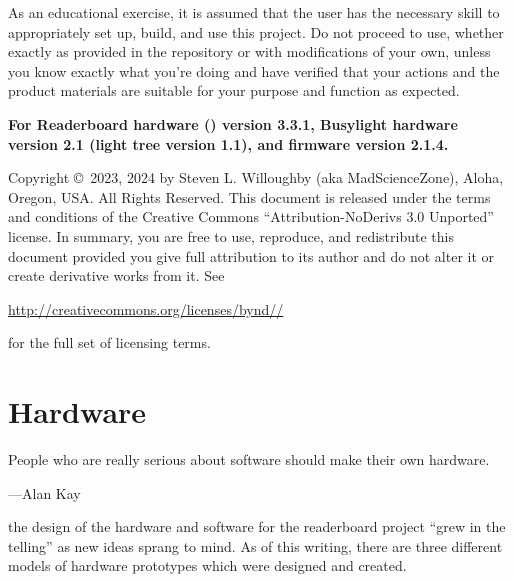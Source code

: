 As an educational exercise, it is assumed that the user has the necessary skill to appropriately set up, build,
and use this project. Do not proceed to use, whether exactly as provided in the repository or with modifications
of your own, unless you know exactly what you're doing and have verified that your actions and the product
materials are suitable for your purpose and function as expected.

\strut\vfill

\begin{center}\bfseries
	For Readerboard hardware () version 3.3.1, 
	Busylight hardware version 2.1 (light tree version 1.1), and firmware version 2.1.4.
\end{center}

\strut\vfill

\noindent Copyright \copyright\ 2023, 2024 by Steven L. Willoughby
(aka MadScienceZone), Aloha, Oregon, USA. All Rights Reserved.
This document is released under the terms and conditions of the
Creative Commons ``Attribution-NoDerivs 3.0 Unported'' license.
In summary, you are free to use, reproduce, and redistribute this 
document provided you give full attribution to its author and do not
alter it or create derivative works from it.  See
\begin{center}
\href{http://creativecommons.org/licenses/by-nd-3.0}{http://creativecommons.org/licenses/by\-nd\-//} 
\end{center}
for the full set of licensing terms.

\begin{center}
\end{center}

\newpage
\tableofcontents
\newpage
\listoffigures
\listoftables
\mainmatter

%
\chapter{Hardware}
\epigraph{People who are really serious about software should make their own hardware.}{---Alan Kay}
 the design of the hardware and software for the read\-erboard
project ``grew in the telling'' as new ideas sprang to mind. As of this writing, there are three
different models of hardware prototypes which were designed and created.

